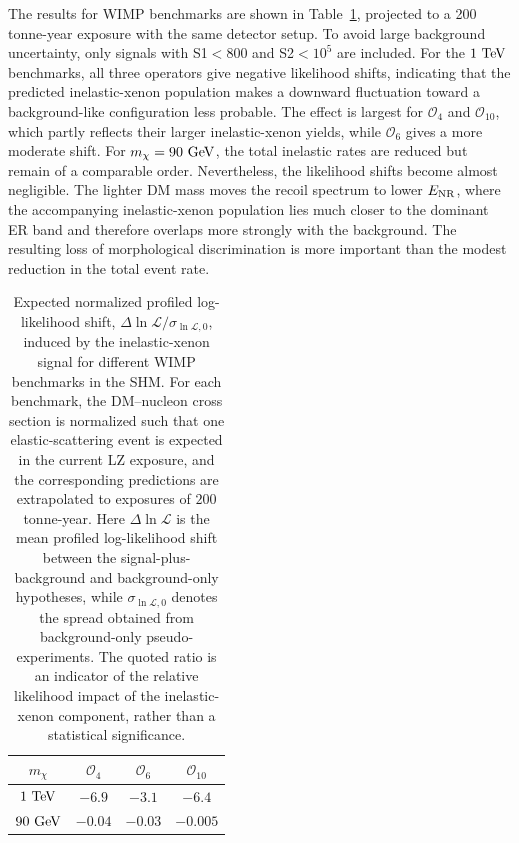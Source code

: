 \documentclass[11pt,a4paper]{article}
\begin{document}
The results for WIMP benchmarks are shown in Table~\ref{tab:stat_WIMP}, projected to a 200 tonne-year exposure with the same detector setup. To avoid large background uncertainty, only signals with S1$<$800 and S2$<10^5$ are included. For the $1~{\rm TeV}$ benchmarks, all three operators give negative likelihood shifts, indicating that the predicted inelastic-xenon population makes a downward fluctuation toward a background-like configuration less probable. The effect is largest for $\mathcal O_4$ and $\mathcal O_{10}$, which partly reflects their larger inelastic-xenon yields, while $\mathcal O_6$ gives a more moderate shift. For $m_\chi=90~{\rm GeV}$, the total inelastic rates are reduced but remain of a comparable order. Nevertheless, the likelihood shifts become almost negligible. The lighter DM mass moves the recoil spectrum to lower $E_{\rm NR}$, where the accompanying inelastic-xenon population lies much closer to the dominant ER band and therefore overlaps more strongly with the background. The resulting loss of morphological discrimination is more important than the modest reduction in the total event rate.


\begin{table}[h!]
    \centering
    \begin{tabular}{c|ccc}
\hline
$m_\chi$ & $\mathcal O_4$ & $\mathcal O_6$ & $\mathcal O_{10}$ \\
\hline
$1~{\rm TeV}$ & $-6.9$ & $-3.1$ & $-6.4$ \\
$90~{\rm GeV}$ & $-0.04$ & $-0.03$ & $-0.005$ \\
\hline
\end{tabular}
\caption{Expected normalized profiled log-likelihood shift, $\Delta\ln\mathscr{L}/\sigma_{\ln\mathscr{L},0}$, induced by the inelastic-xenon signal for different WIMP benchmarks in the SHM. For each benchmark, the DM--nucleon cross section is normalized such that one elastic-scattering event is expected in the current LZ exposure, and the corresponding predictions are extrapolated to exposures of $200$ tonne-year. Here $\Delta\ln\mathscr{L}$ is the mean profiled log-likelihood shift between the signal-plus-background and background-only hypotheses, while $\sigma_{\ln\mathscr{L},0}$ denotes the spread obtained from background-only pseudo-experiments. The quoted ratio is an indicator of the relative likelihood impact of the inelastic-xenon component, rather than a statistical significance.}
\label{tab:stat_WIMP}
\end{table}
\end{document}
